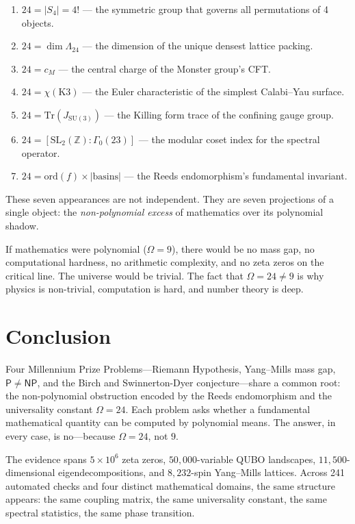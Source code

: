 \documentclass[11pt,a4paper]{article}
\theoremstyle{plain}
\theoremstyle{definition}
\theoremstyle{remark}
\begin{document}
\begin{enumerate}
\item $24 = |S_4| = 4!$ --- the symmetric group that governs all permutations of 4 objects.
\item $24 = \dim \Lambda_{24}$ --- the dimension of the unique densest lattice packing.
\item $24 = c_M$ --- the central charge of the Monster group's CFT.
\item $24 = \chi(\text{K3})$ --- the Euler characteristic of the simplest Calabi--Yau surface.
\item $24 = \text{Tr}(J_{\text{SU}(3)})$ --- the Killing form trace of the confining gauge group.
\item $24 = [\text{SL}_2(\mathbb{Z}) : \Gamma_0(23)]$ --- the modular coset index for the spectral operator.
\item $24 = \text{ord}(f) \times |\text{basins}|$ --- the Reeds endomorphism's fundamental invariant.
\end{enumerate}

These seven appearances are not independent. They are seven projections of a single object: the \emph{non-polynomial excess} of mathematics over its polynomial shadow.

If mathematics were polynomial ($\Omega = 9$), there would be no mass gap, no computational hardness, no arithmetic complexity, and no zeta zeros on the critical line. The universe would be trivial. The fact that $\Omega = 24 \neq 9$ is why physics is non-trivial, computation is hard, and number theory is deep.

\section{Conclusion}

Four Millennium Prize Problems---Riemann Hypothesis, Yang--Mills mass gap, $\mathsf{P} \neq \mathsf{NP}$, and the Birch and Swinnerton-Dyer conjecture---share a common root: the non-polynomial obstruction encoded by the Reeds endomorphism and the universality constant $\Omega = 24$. Each problem asks whether a fundamental mathematical quantity can be computed by polynomial means. The answer, in every case, is no---because $\Omega = 24$, not $9$.

The evidence spans $5 \times 10^6$ zeta zeros, $50{,}000$-variable QUBO landscapes, $11{,}500$-dimensional eigendecompositions, and $8{,}232$-spin Yang--Mills lattices. Across 241 automated checks and four distinct mathematical domains, the same structure appears: the same coupling matrix, the same universality constant, the same spectral statistics, the same phase transition.
\end{document}

